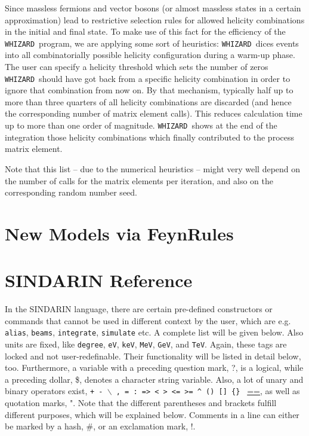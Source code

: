\documentclass[12pt]{book}
\newcommand{\ttt}[1]{\texttt{#1}}
\newcommand{\whizard}{\texttt{WHIZARD}}
\begin{document}
Since massless fermions and vector bosons (or almost massless states
in a certain approximation) lead to restrictive selection rules for
allowed helicity combinations in the initial and final state. To make
use of this fact for the efficiency of the \whizard\ program, we are
applying some sort of heuristics: \whizard\ dices events into all
combinatorially possible helicity configuration during a warm-up
phase. The user can specify a helicity threshold which sets the number
of zeros \whizard\ should have got back from a specific helicity
combination in order to ignore that combination from now on. By that
mechanism, typically half up to more than three quarters of all
helicity combinations are discarded (and hence the corresponding
number of matrix element calls). This reduces calculation time up to
more than one order of magnitude. \whizard\ shows at the end of the
integration those helicity combinations which finally contributed to
the process matrix element.

Note that this list -- due to the numerical heuristics -- might very
well depend on the number of calls for the matrix elements per
iteration, and also on the corresponding random number seed.  


\chapter{New Models via FeynRules}



\appendix

\chapter{SINDARIN Reference}

\medskip

In the SINDARIN language, there are certain pre-defined constructors or
commands that cannot be used in different context by the user, which
are e.g. \ttt{alias}, \ttt{beams}, \ttt{integrate}, \ttt{simulate} etc.
A complete list will be given below. Also units are fixed, like
\ttt{degree}, \ttt{eV}, \ttt{keV},  
\ttt{MeV}, \ttt{GeV}, and \ttt{TeV}. Again, these tags are locked and
not user-redefinable. Their functionality will be listed in detail
below, too. Furthermore, a variable with a preceding
question mark, ?, is a logical, while a preceding dollar, \$, denotes a
character string variable.  Also, a lot of unary and binary operators
exist, \ttt{+ - $\backslash$ , = : => < > <= >= \^ \;  () [] \{\} }
\url{==}, as well as quotation marks, ". Note that the
different parentheses and brackets fulfill different purposes, which
will be explained below. Comments in a line can either be marked by a
hash, \#, or an exclamation mark, !.   
\end{document}
